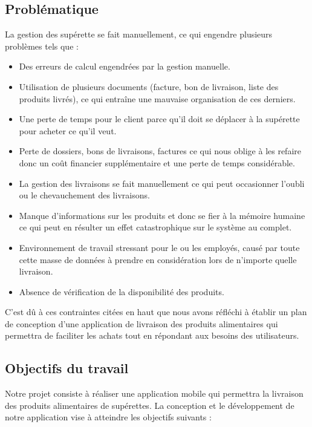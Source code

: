 \documentclass{report}
\begin{document}
\subsection{Problématique}
La gestion des supérette se fait manuellement, ce qui engendre plusieurs problèmes tels que :

\begin{itemize}
    \item Des erreurs de calcul engendrées par la gestion manuelle.
    \item Utilisation de plusieurs documents (facture, bon de livraison, liste des produits livrés), ce qui entraîne une mauvaise organisation de ces derniers.
    \item Une perte de temps pour le client parce qu’il doit se déplacer à la supérette pour acheter ce qu’il veut.
    \item Perte de dossiers, bons de livraisons, factures ce qui nous oblige à les refaire donc un coût financier supplémentaire et une perte de temps considérable.
    \item La gestion des livraisons se fait manuellement ce qui peut occasionner l’oubli ou le chevauchement des livraisons.
    \item Manque d’informations sur les produits et donc se fier à la mémoire humaine ce qui peut en résulter un effet catastrophique sur le système au complet.
    \item Environnement de travail stressant pour le ou les employés, causé par toute cette masse de données à prendre en considération lors de n’importe quelle livraison.
    \item Absence de vérification de la disponibilité des produits.
\end{itemize}

C’est dû à ces contraintes citées en haut que nous avons réfléchi à établir un plan de conception d’une application de livraison des produits alimentaires qui permettra de faciliter les achats tout en répondant aux besoins des utilisateurs.

\subsection{Objectifs du travail}
Notre projet consiste à réaliser une application mobile qui permettra la livraison des produits alimentaires de supérettes. La conception et le développement de notre application vise à atteindre les objectifs suivants :
\end{document}
